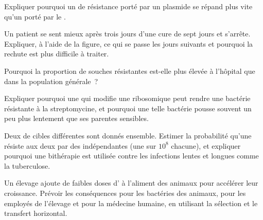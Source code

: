 \begin{exercise}[$\star\star$]\label{exo:g11:antibiotic-resistance:8}
Expliquer pourquoi un  de résistance porté par un plasmide se
répand plus vite qu'un  porté par le .
\end{exercise}

\begin{exercise}[$\star\star$]\label{exo:g11:antibiotic-resistance:9}
Un patient se sent mieux après trois jours d'une cure de sept jours et
s'arrête. Expliquer, à l'aide de la figure, ce qui se passe les jours
suivants et pourquoi la rechute est plus difficile à traiter.
\end{exercise}

\begin{exercise}[$\star\star$]\label{exo:g11:antibiotic-resistance:10}
Pourquoi la proportion de souches résistantes est-elle plus élevée à
l'hôpital que dans la population générale~?
\end{exercise}

\begin{exercise}[$\star\star$]\label{exo:g11:antibiotic-resistance:11}
Expliquer pourquoi une  qui modifie une  ribosomique
peut rendre une bactérie résistante à la streptomycine, et pourquoi une
telle bactérie pousse souvent un peu plus lentement que ses parentes
sensibles.
\end{exercise}

\begin{exercise}[$\star\star\star$]\label{exo:g11:antibiotic-resistance:12}
Deux  de cibles différentes sont donnés ensemble. Estimer
la probabilité qu'une  résiste aux deux par des 
indépendantes (une sur $10^8$ chacune), et expliquer pourquoi une
bithérapie est utilisée contre les infections lentes et longues comme
la tuberculose.
\end{exercise}

\begin{exercise}[$\star\star\star$]\label{exo:g11:antibiotic-resistance:13}
Un élevage ajoute de faibles doses d' à l'aliment des
animaux pour accélérer leur croissance. Prévoir les conséquences pour
les bactéries des animaux, pour les employés de l'élevage et pour la
médecine humaine, en utilisant la sélection et le transfert horizontal.
\end{exercise}

